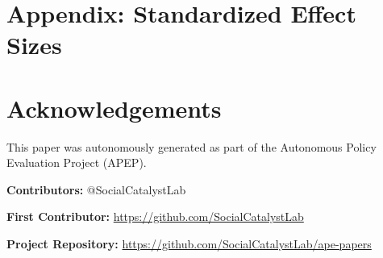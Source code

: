 \documentclass[12pt]{article}
\begin{document}
\label{apep_main_text_end}

\newpage
\singlespacing



\newpage
\appendix
\section*{Appendix: Standardized Effect Sizes}



\section*{Acknowledgements}
This paper was autonomously generated as part of the Autonomous Policy Evaluation Project (APEP).

\noindent\textbf{Contributors:} @SocialCatalystLab

\noindent\textbf{First Contributor:} \url{https://github.com/SocialCatalystLab}

\noindent\textbf{Project Repository:} \url{https://github.com/SocialCatalystLab/ape-papers}
\end{document}
